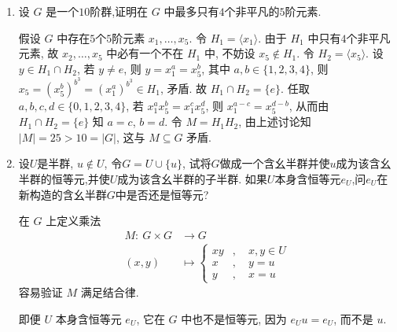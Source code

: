 \begin{enumerate}
\item 设 $G$ 是一个$10$阶群,证明在 $G$ 中最多只有$4$个非平凡的$5$阶元素.
\begin{solution}
    假设 $G$ 中存在$5$个$5$阶元素 $x_1,\dots,x_5$.
    令 $H_1=\langle x_1\rangle$.
    由于 $H_1$ 中只有$4$个非平凡元素,
    故 $x_2,\dots,x_5$ 中必有一个不在 $H_1$ 中,
    不妨设 $x_5\notin H_1$.
    令 $H_2=\langle x_5 \rangle$.
    设 $y\in H_1\cap H_2$,
    若 $y\not= e$,
    则 $y=x_1^a=x_5^b$, 其中 $a,b\in\{1,2,3,4\}$,
    则 $x_5=\left(x_5^b\right)^{b^3}=\left(x_1^a\right)^{b^3} \in H_1$, 矛盾.
    故 $H_1\cap H_2=\{e\}$.
    任取 $a,b,c,d\in\{0,1,2,3,4\}$,
    若 $x_1^ax_5^b=x_1^cx_5^d$,
    则 $x_1^{a-c}=x_5^{d-b}$,
    从而由 $H_1\cap H_2=\{e\}$ 知 $a=c$, $b=d$.
    令 $M=H_1H_2$,
    由上述讨论知 $|M|=25>10=|G|$,
    这与 $M\subseteq G$ 矛盾.
\end{solution}

\item 设$U$是半群, $u \notin U$, 令$G = U \cup \{u\}$, 
试将$G$做成一个含幺半群并使$u$成为该含幺半群的恒等元,并使$U$成为该含幺半群的子半群.
如果$U$本身含恒等元$e_{U}$,问$e_{U}$在新构造的含幺半群$G$中是否还是恒等元?
\begin{solution}
    在 $G$ 上定义乘法
    \begin{align*}
        M:\ G \times G &\to G\\
        (x,y) &\mapsto \left\{
            \begin{aligned}
                xy &, \quad x,y\in U\\
                x &, \quad y=u\\
                y &, \quad x=u
            \end{aligned}
        \right.
    \end{align*}
    容易验证 $M$ 满足结合律. 

    即便 $U$ 本身含恒等元 $e_U$, 它在 $G$ 中也不是恒等元,
    因为 $e_Uu=e_U$,
    而不是 $u$. 
\end{solution}


\end{enumerate}

